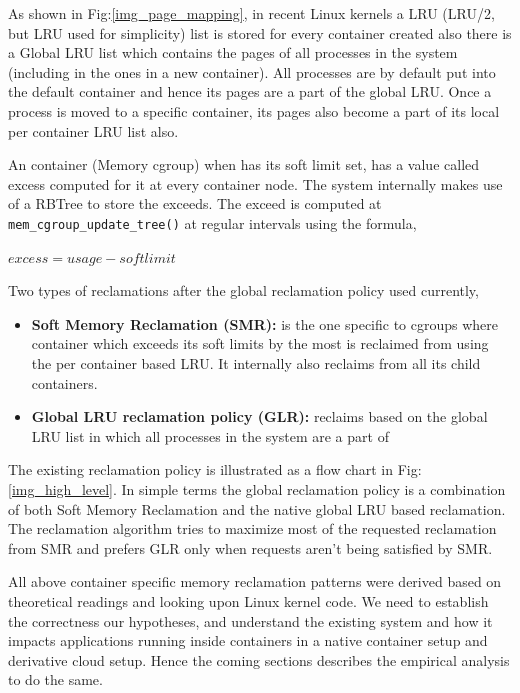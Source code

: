       As shown in Fig:\ref{img_page_mapping}, in recent Linux kernels a LRU (LRU/2, but LRU used for simplicity) list is stored for every 
container created also there is a Global LRU list which contains the pages of all processes in the system (including in the ones in a new 
container). All processes are by default put into the default container and hence its pages are a part of the global LRU.  Once a process is 
moved to a specific container, its pages also become a part of its local per container LRU list also.
    
      An container (Memory cgroup) when has its soft limit set, has a value called excess computed for it at every container node. The 
system internally makes use of a RBTree to store the exceeds. The exceed is computed at \texttt{mem\_cgroup\_update\_tree()} at regular 
intervals using the formula,
      
      \begin{center}
	$ excess = usage - softlimit $
      \end{center}
      
      \pagebreak
      
      \noindent Two types of reclamations after the global reclamation policy used currently, 
      
      \begin{itemize}
       \item \textbf{Soft Memory Reclamation (SMR):} is the one specific to cgroups where container which exceeds its 
soft limits by the most is reclaimed from using the per container based LRU. It internally also reclaims from all its child containers.  
       \item \textbf{Global LRU reclamation policy (GLR):} reclaims based on the global LRU list in which all processes in the system are a 
part of
      \end{itemize}     
      
      The existing reclamation policy is illustrated as a flow chart in Fig:\ref{img_high_level}. In simple terms the global reclamation 
policy is a combination of both Soft Memory Reclamation and the native global LRU based reclamation. The reclamation algorithm tries to 
maximize most of the requested reclamation from SMR and prefers GLR only when requests aren't being satisfied by SMR.

      All above container specific memory reclamation patterns were derived based on theoretical readings and looking upon Linux kernel 
code. We need to establish the correctness our hypotheses, and understand the existing system and how it impacts applications running 
inside containers in a native container setup and derivative cloud setup. Hence the coming sections describes the empirical analysis to 
do the same.  

